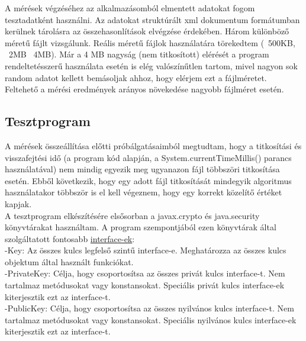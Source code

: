 \vspace{25pt}

A mérések végzéséhez az alkalmazásomból elmentett adatokat fogom tesztadatként használni. Az adatokat struktúrált xml dokumentum formátumban kerülnek tárolásra az összehasonlítások elvégzése érdekében. Három különböző méretű fájlt vizsgálunk. Reális méretű fájlok használatára törekedtem (~500KB, ~2MB ~4MB). Már a 4 MB nagyság (nem titkosított) elérését a program rendeltetésszerű használata esetén is elég valószínűtlen tartom, mivel nagyon sok random adatot kellett bemásoljak ahhoz, hogy elérjem ezt a fájlméretet. 
\vspace{5pt}\\Feltehető a mérési eredmények arányos növekedése nagyobb fájlméret esetén.

\subsection{Tesztprogram}
\vspace{5pt}\noindent A mérések összeállítása előtti próbálgatásaimból megtudtam, hogy a titkosítási és visszafejtési idő (a program kód alapján, a System.currentTimeMillis() parancs használatával) nem mindig egyezik meg ugyanazon fájl többszöri titkosítása esetén. Ebből következik, hogy egy adott fájl titkosítását mindegyik algoritmus használatakor többször is el kell végeznem, hogy egy korrekt közelítő értéket kapjak.
\vspace{5pt}\\A tesztprogram elkészítésére elsősorban a javax.crypto és java.security könyvtárakat használtam. A program szempontjából ezen könyvtárak által szolgáltatott fontosabb \underline{interface-ek}:
\vspace{5pt}\\-Key: Az összes kulcs legfelső szintű interface-e. Meghatározza az összes kulcs objektum által használt funkciókat.
\vspace{5pt}\\-PrivateKey: Célja, hogy csoportosítsa az összes privát kulcs interface-t. Nem tartalmaz metódusokat vagy konstansokat. Speciális privát kulcs interface-ek kiterjesztik ezt az interface-t. 
\vspace{5pt}\\-PublicKey: Célja, hogy csoportosítsa az összes nyilvános kulcs interface-t. Nem tartalmaz metódusokat vagy konstansokat. Speciális nyilvános kulcs interface-ek kiterjesztik ezt az interface-t. \newline

